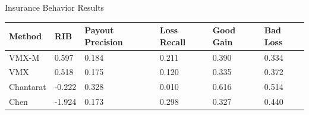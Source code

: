 \documentclass{beamer}
\begin{document}
    

\begin{frame}{Insurance Behavior Results}
    \begin{table}[]
        \centering
        \small
        \begin{tabular}{llllll}
        Method    & RIB    & Payout Precision & Loss Recall & Good Gain & Bad Loss \\ \hline
        VMX-M     & 0.597  & 0.184            & 0.211       & 0.390          & 0.334        \\
        VMX       & 0.518  & 0.175            & 0.120       & 0.335          & 0.372        \\
        Chantarat & -0.222 & 0.328            & 0.010       & 0.616          & 0.514        \\
        Chen      & -1.924 & 0.173            & 0.298       & 0.327          & 0.440       
        \end{tabular}
        \end{table}
\end{frame}

\end{document}
